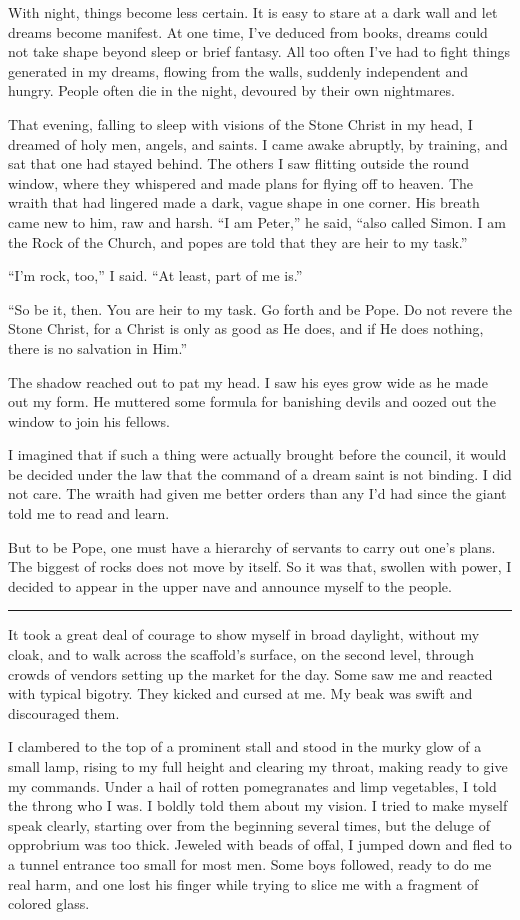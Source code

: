 With night, things become less certain. It is easy to stare at a dark wall and let dreams become manifest. At one time, I've deduced from books, dreams could not take shape beyond sleep or brief fantasy. All too often I've had to fight things generated in my dreams, flowing from the walls, suddenly independent and hungry. People often die in the night, devoured by their own nightmares.

That evening, falling to sleep with visions of the Stone Christ in my head, I dreamed of holy men, angels, and saints. I came awake abruptly, by training, and sat that one had stayed behind. The others I saw flitting outside the round window, where they whispered and made plans for flying off to heaven. The wraith that had lingered made a dark, vague shape in one corner. His breath came new to him, raw and harsh. ``I am Peter,'' he said, ``also called Simon. I am the Rock of the Church, and popes are told that they are heir to my task.''

``I'm rock, too,'' I said. ``At least, part of me is.''

``So be it, then. You are heir to my task. Go forth and be Pope. Do not revere the Stone Christ, for a Christ is only as good as He does, and if He does nothing, there is no salvation in Him.''

The shadow reached out to pat my head. I saw his eyes grow wide as he made out my form. He muttered some formula for banishing devils and oozed out the window to join his fellows.

I imagined that if such a thing were actually brought before the council, it would be decided under the law that the command of a dream saint is not binding. I did not care. The wraith had given me better orders than any I'd had since the giant told me to read and learn.

But to be Pope, one must have a hierarchy of servants to carry out one's plans. The biggest of rocks does not move by itself. So it was that, swollen with power, I decided to appear in the upper nave and announce myself to the people.

\fancybreak{* * *}

It took a great deal of courage to show myself in broad daylight, without my cloak, and to walk across the scaffold's surface, on the second level, through crowds of vendors setting up the market for the day. Some saw me and reacted with typical bigotry. They kicked and cursed at me. My beak was swift and discouraged them.

I clambered to the top of a prominent stall and stood in the murky glow of a small lamp, rising to my full height and clearing my throat, making ready to give my commands. Under a hail of rotten pomegranates and limp vegetables, I told the throng who I was. I boldly told them about my vision. I tried to make myself speak clearly, starting over from the beginning several times, but the deluge of opprobrium was too thick. Jeweled with beads of offal, I jumped down and fled to a tunnel entrance too small for most men. Some boys followed, ready to do me real harm, and one lost his finger while trying to slice me with a fragment of colored glass.

